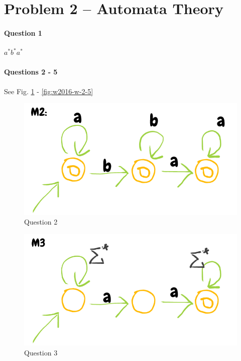 \section{Problem 2 – Automata Theory}
\paragraph{Question 1}
$a^*b^*a^*$

\paragraph{Questions 2 - 5}
See Fig. \ref{fig:w2016-w-2-2} - \ref{fig:w2016-w-2-5}

\begin{figure}[!h]
    \centering
    \includegraphics[scale=0.5]{data/2016-W-2-2.png}
    \caption{Question 2}
    \label{fig:w2016-w-2-2}
\end{figure}

\begin{figure}[!h]
    \centering
    \includegraphics[scale=0.5]{data/2016-W-2-3.png}
    \caption{Question 3}
    \label{fig:w2016-w-2-3}
\end{figure}


